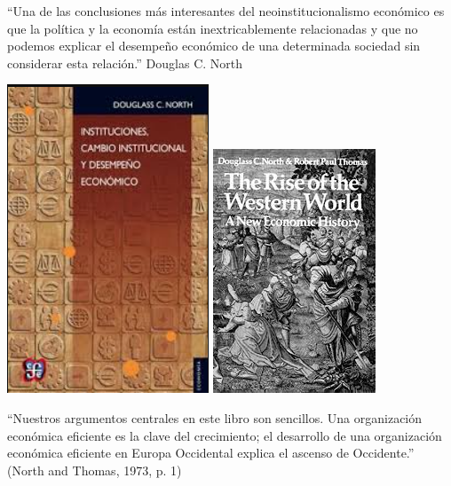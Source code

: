 \documentclass{beamer}
\begin{document}
\begin{frame}
    \centering
    \begin{boxA}
        \footnotesize
        \centering
        “Una de las conclusiones más interesantes del neoinstitucionalismo económico es que la política y la economía están inextricablemente relacionadas y que no podemos explicar el desempeño económico de una determinada sociedad sin considerar esta relación.” Douglas C. North
    \end{boxA}
    \includegraphics[scale=0.45]{../Figures/North (1990).png}
    \includegraphics[scale=0.35]{../Figures/North and Thomas book.jpg}
    \begin{boxA}
        \footnotesize
        \centering
        “Nuestros argumentos centrales en este libro son sencillos. Una organización económica eficiente es la clave del crecimiento; el desarrollo de una organización económica eficiente en Europa Occidental explica el ascenso de Occidente.” (North and Thomas, 1973, p. 1)
    \end{boxA}
\end{frame}
\end{document}

